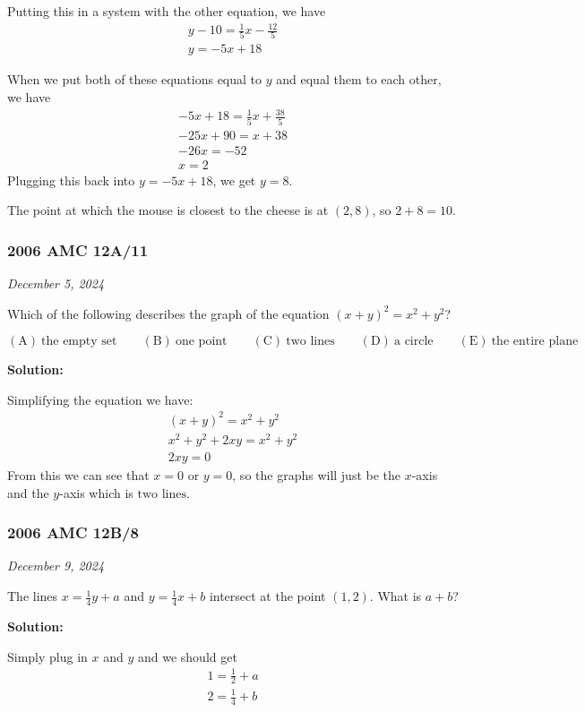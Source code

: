 \documentclass[../mathproblems.tex]{subfiles}
\begin{document}
Putting this in a system with the other equation, we have 
\begin{align*}
y - 10 = \frac{1}{5}x - \frac{12}{5} \\ 
y = -5x+18
\end{align*}

When we put both of these equations equal to $y$ and equal them to each other, we have  
\begin{align*}
-5x+18 = \frac{1}{5}x + \frac{38}{5}\\
-25x + 90 = x + 38 \\
-26x = -52 \\
x = 2
\end{align*}
Plugging this back into $y=-5x+18$, we get $y=8$.

The point at which the mouse is closest to the cheese is at $(2,8)$, so $2+8 = \boxed{10}$.

\noindent\hrulefill
\subsubsection*{2006 AMC 12A/11}
\textit{December 5, 2024}

Which of the following describes the graph of the equation $(x+y)^2=x^2+y^2$?

$\mathrm{(A)}\ \text{the empty set}\qquad\mathrm{(B)}\ \text{one point}\qquad\mathrm{(C)}\ \text{two lines}\qquad\mathrm{(D)}\ \text{a circle}\qquad\mathrm{(E)}\ \text{the entire plane}$ 

\textbf{Solution:}

Simplifying the equation we have:
\begin{align*}
    (x+y)^2=x^2+y^2\\
x^2+y^2+2xy=x^2+y^2 \\
2xy=0
\end{align*}
From this we can see that $x=0$ or $y=0$, so the graphs will just be the $x$-axis and the $y$-axis which is $\boxed{\text{two lines}}$.

\noindent\hrulefill

\subsubsection*{2006 AMC 12B/8}
\textit{December 9, 2024}

The lines $ x = \frac 14y + a$ and $ y = \frac 14x + b$ intersect at the point $ (1,2)$. What is $ a + b$?

\textbf{Solution:}

Simply plug in $x$ and $y$ and we should get 
\begin{align*}
    1 = \frac{1}{2} + a \\
    2 = \frac{1}{4} + b 
\end{align*}
\end{document}
